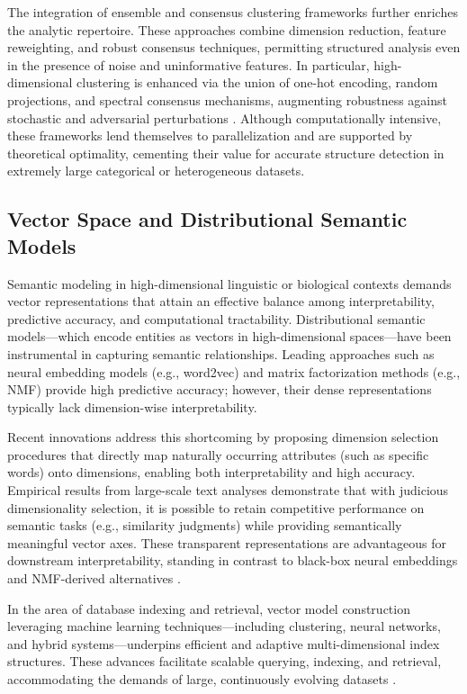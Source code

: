 The integration of ensemble and consensus clustering frameworks further enriches the analytic repertoire. These approaches combine dimension reduction, feature reweighting, and robust consensus techniques, permitting structured analysis even in the presence of noise and uninformative features. In particular, high-dimensional clustering is enhanced via the union of one-hot encoding, random projections, and spectral consensus mechanisms, augmenting robustness against stochastic and adversarial perturbations \cite{ref92,ref95}. Although computationally intensive, these frameworks lend themselves to parallelization and are supported by theoretical optimality, cementing their value for accurate structure detection in extremely large categorical or heterogeneous datasets.

\subsection{Vector Space and Distributional Semantic Models}

Semantic modeling in high-dimensional linguistic or biological contexts demands vector representations that attain an effective balance among interpretability, predictive accuracy, and computational tractability. Distributional semantic models—which encode entities as vectors in high-dimensional spaces—have been instrumental in capturing semantic relationships. Leading approaches such as neural embedding models (e.g., word2vec) and matrix factorization methods (e.g., NMF) provide high predictive accuracy; however, their dense representations typically lack dimension-wise interpretability.

Recent innovations address this shortcoming by proposing dimension selection procedures that directly map naturally occurring attributes (such as specific words) onto dimensions, enabling both interpretability and high accuracy. Empirical results from large-scale text analyses demonstrate that with judicious dimensionality selection, it is possible to retain competitive performance on semantic tasks (e.g., similarity judgments) while providing semantically meaningful vector axes. These transparent representations are advantageous for downstream interpretability, standing in contrast to black-box neural embeddings and NMF-derived alternatives \cite{ref115}.

In the area of database indexing and retrieval, vector model construction leveraging machine learning techniques—including clustering, neural networks, and hybrid systems—underpins efficient and adaptive multi-dimensional index structures. These advances facilitate scalable querying, indexing, and retrieval, accommodating the demands of large, continuously evolving datasets \cite{ref113}.

